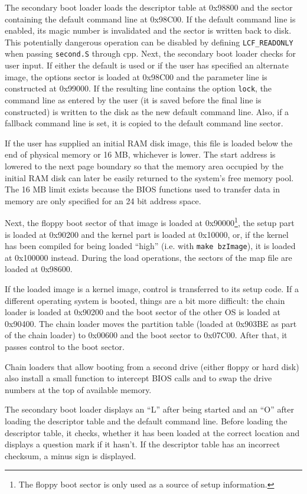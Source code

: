 The secondary boot loader loads the descriptor table at 0x98800 and the
sector containing the default command line at 0x98C00. If the default command
line is enabled, its magic number is invalidated and the sector is written
back to disk. This potentially dangerous operation can be disabled by defining
{\tt LCF\_READONLY} when passing {\tt second.S} through {\sf cpp}. Next, the
secondary boot loader checks
for user input. If either the default is used or if the user has specified
an alternate image, the options sector is loaded at 0x98C00 and the parameter
line is constructed at 0x99000. If the resulting line contains the option
\verb"lock", the command line as entered by the user (it is saved before
the final line is constructed) is written to the disk as the new default
command line. Also, if a fallback command line is set, it is copied to the
default command line sector.

If the user has supplied an initial RAM disk image, this file is loaded
below the end of physical memory or 16 MB, whichever is lower. The start
address is lowered to the next page boundary so that the memory area
occupied by the initial RAM disk can later be easily returned to the
system's free memory pool. The 16 MB limit exists because the BIOS
functions used to transfer data in memory are only specified for an 24 bit
address space.

Next, the floppy boot sector of that image is
loaded at 0x90000\footnote{The floppy boot sector is only used as a source of
setup information.},
the setup part is loaded at 0x90200 and
the kernel part is loaded at 0x10000, or, if the kernel has been compiled
for being loaded ``high'' (i.e. with {\tt make bzImage}), it is loaded
at 0x100000 instead. During the load operations, the sectors
of the map file are loaded at 0x98600.

If the loaded image is a kernel image, control is transferred to
its setup code.
If a different operating system is booted, things are a bit more difficult:
the chain loader is loaded at 0x90200 and the boot sector of the other OS
is loaded at 0x90400. The chain loader moves the partition table (loaded at
0x903BE as part of the chain loader) to 0x00600 and the boot sector to
0x07C00. After that, it passes control to the boot sector.

Chain loaders that allow booting from a second drive (either floppy or hard
disk) also install a small function to intercept BIOS calls and to swap
the drive numbers at the top of available memory.

The secondary boot loader displays an ``L'' after being started and an ``O''
after loading the descriptor table and the default command line. Before
loading the descriptor table, it checks, whether it has been loaded at the
correct location and displays a question mark if it hasn't. If the
descriptor table has an incorrect checksum, a minus sign is displayed.


